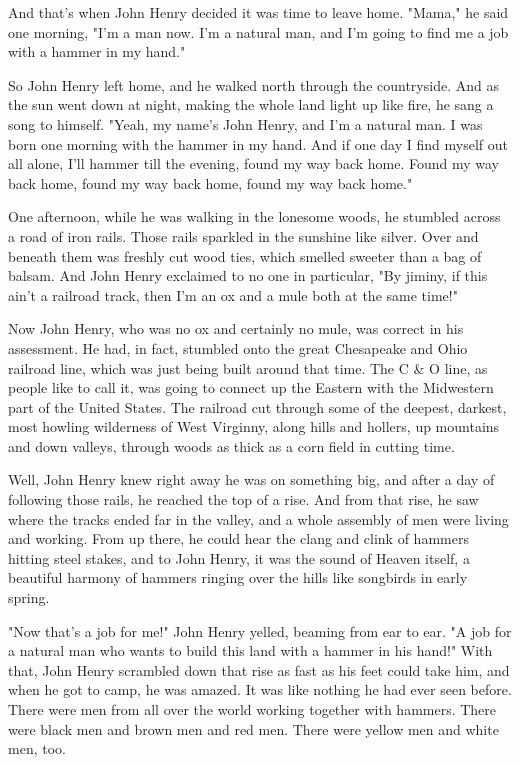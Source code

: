 And that's when John Henry decided it was time to leave home. "Mama," he said one morning, "I'm a man now. I'm a natural man, and I'm going to find me a job with a hammer in my hand."

So John Henry left home, and he walked north through the countryside. And as the sun went down at night, making the whole land light up like fire, he sang a song to himself. "Yeah, my name's John Henry, and I'm a natural man. I was born one morning with the hammer in my hand. And if one day I find myself out all alone, I'll hammer till the evening, found my way back home. Found my way back home, found my way back home, found my way back home."

One afternoon, while he was walking in the lonesome woods, he stumbled across a road of iron rails. Those rails sparkled in the sunshine like silver. Over and beneath them was freshly cut wood ties, which smelled sweeter than a bag of balsam. And John Henry exclaimed to no one in particular, "By jiminy, if this ain't a railroad track, then I'm an ox and a mule both at the same time!"

Now John Henry, who was no ox and certainly no mule, was correct in his assessment. He had, in fact, stumbled onto the great Chesapeake and Ohio railroad line, which was just being built around that time. The C \& O line, as people like to call it, was going to connect up the Eastern with the Midwestern part of the United States. The railroad cut through some of the deepest, darkest, most howling wilderness of West Virginny, along hills and hollers, up mountains and down valleys, through woods as thick as a corn field in cutting time.

Well, John Henry knew right away he was on something big, and after a day of following those rails, he reached the top of a rise. And from that rise, he saw where the tracks ended far in the valley, and a whole assembly of men were living and working. From up there, he could hear the clang and clink of hammers hitting steel stakes, and to John Henry, it was the sound of Heaven itself, a beautiful harmony of hammers ringing over the hills like songbirds in early spring.

"Now that's a job for me!" John Henry yelled, beaming from ear to ear. "A job for a natural man who wants to build this land with a hammer in his hand!" With that, John Henry scrambled down that rise as fast as his feet could take him, and when he got to camp, he was amazed. It was like nothing he had ever seen before. There were men from all over the world working together with hammers. There were black men and brown men and red men. There were yellow men and white men, too.

